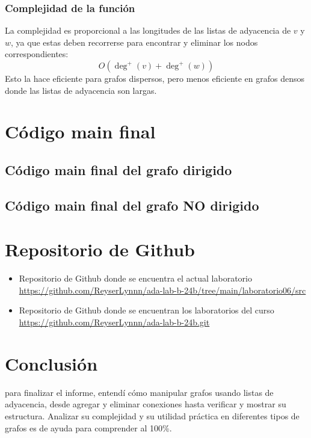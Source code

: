 \documentclass{article}
\begin{document}
        \subsubsection*{Complejidad de la función}
            La complejidad es proporcional a las longitudes de las listas de adyacencia de \( v \) y \( w \), ya que estas deben recorrerse para encontrar y eliminar los nodos correspondientes:
            \[
            O(\deg^+(v) + \deg^+(w))
            \]
            Esto la hace eficiente para grafos dispersos, pero menos eficiente en grafos densos donde las listas de adyacencia son largas.

\section{Código main final}
    \subsection{Código main final del grafo dirigido}
        

    \subsection{Código main final del grafo NO dirigido}
        

            
\section{Repositorio de Github}
	\begin{itemize}
		\item Repositorio de Github donde se encuentra el actual laboratorio \\
		\url{https://github.com/ReyserLynnn/ada-lab-b-24b/tree/main/laboratorio06/src}

        \item Repositorio de Github donde se encuentran los laboratorios del curso\\
		\url{https://github.com/ReyserLynnn/ada-lab-b-24b.git}
	\end{itemize}

\section{Conclusión}
	para finalizar el informe, entendí cómo manipular grafos usando listas de adyacencia, desde agregar y eliminar conexiones hasta verificar y mostrar su estructura. Analizar su complejidad y su utilidad práctica en diferentes tipos de grafos es de ayuda para comprender al 100\%.

\end{document}
